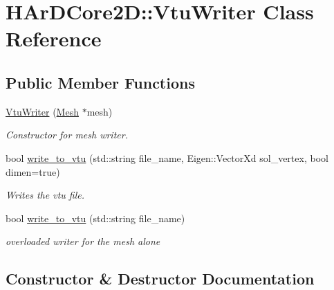 \hypertarget{classHArDCore2D_1_1VtuWriter}{}\section{H\+Ar\+D\+Core2D\+:\+:Vtu\+Writer Class Reference}
\label{classHArDCore2D_1_1VtuWriter}
\subsection*{Public Member Functions}
\begin{DoxyCompactItemize}
\item 
\hyperlink{classHArDCore2D_1_1VtuWriter_a6e7b1979b243145647b544b680a85b7d}{Vtu\+Writer} (\hyperlink{classHArDCore2D_1_1Mesh}{Mesh} $\ast$mesh)
\begin{DoxyCompactList}\small\item\em Constructor for mesh writer. \end{DoxyCompactList}\item 
bool \hyperlink{classHArDCore2D_1_1VtuWriter_a003fe99f02fada3b80371bf442685d56}{write\+\_\+to\+\_\+vtu} (std\+::string file\+\_\+name, Eigen\+::\+Vector\+Xd sol\+\_\+vertex, bool dimen=true)
\begin{DoxyCompactList}\small\item\em Writes the vtu file. \end{DoxyCompactList}\item 
\mbox{\label{classHArDCore2D_1_1VtuWriter_aaf75193eddca3a0d369ad71c10c2be68}} 
bool \hyperlink{classHArDCore2D_1_1VtuWriter_aaf75193eddca3a0d369ad71c10c2be68}{write\+\_\+to\+\_\+vtu} (std\+::string file\+\_\+name)
\begin{DoxyCompactList}\small\item\em overloaded writer for the mesh alone \end{DoxyCompactList}\end{DoxyCompactItemize}


\subsection{Constructor \& Destructor Documentation}
\mbox{\label{classHArDCore2D_1_1VtuWriter_a6e7b1979b243145647b544b680a85b7d}} 
